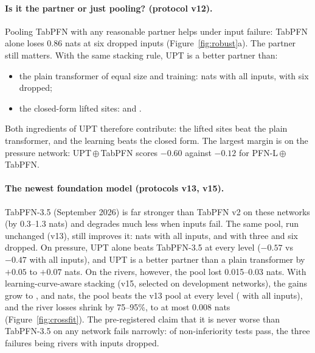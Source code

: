 \paragraph{Is it the partner or just pooling? (protocol v12).} Pooling TabPFN with any reasonable partner helps under
input failure: TabPFN alone loses 0.86 nats at six dropped inputs (Figure~\ref{fig:robust}a). The partner still
matters. With the same stacking rule, UPT is a better partner than:
\begin{itemize}
  \item the plain transformer of equal size and training: \YOneZero{} nats with all inputs, \YOneSix{} with six
  dropped;
  \item the closed-form lifted sites: \YTwoZero{} and \YTwoSix{}.
\end{itemize}
Both ingredients of UPT therefore contribute: the lifted sites beat the plain transformer, and the learning beats
the closed form. The largest margin is on the pressure network: UPT\,$\oplus$\,TabPFN scores $-0.60$ against $-0.12$
for PFN-L\,$\oplus$\,TabPFN.

\paragraph{The newest foundation model (protocols v13, v15).} TabPFN-3.5 (September 2026) is far stronger than
TabPFN v2 on these networks (by 0.3--1.3 nats) and degrades much less when inputs fail. The same pool, run unchanged
(v13), still improves it: \ZOne{} nats with all inputs, \ZTwoThree{} and \ZTwoSix{} with three and six dropped. On
pressure, UPT alone beats TabPFN-3.5 at every level ($-0.57$ vs $-0.47$ with all inputs), and UPT is a better partner
than a plain transformer by $+0.05$ to $+0.07$ nats. On the rivers, however, the pool lost 0.015--0.03 nats. With learning-curve-aware stacking (v15,
selected on development networks), the gains grow to \VOne{}, \VTwoThree{} and \VTwoSix{} nats, the pool beats the
v13 pool at every level (\VPoolZero{} with all inputs), and the river losses shrink by 75--95\%, to at most 0.008
nats (Figure~\ref{fig:crossfit}). The pre-registered claim that it is never worse than TabPFN-3.5 on any network fails narrowly: \VThreePass{} of
\VThreeN{} non-inferiority tests pass, the three failures being rivers with inputs dropped.

